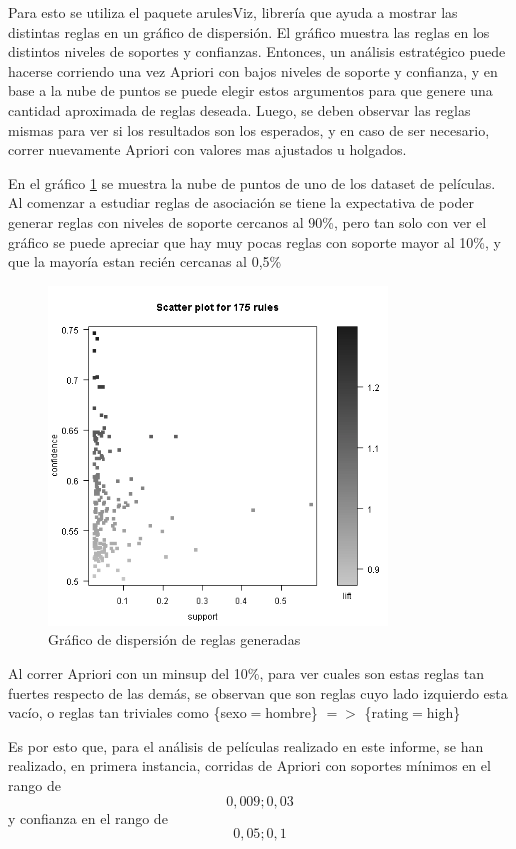 \documentclass[journal]{IEEEtran}
\begin{document}
Para esto se utiliza el paquete arulesViz, librería que ayuda a mostrar las 
distintas reglas en un gráfico de dispersión. El gráfico muestra las reglas
en los distintos niveles de soportes y confianzas. Entonces, un análisis estratégico
puede hacerse corriendo una vez Apriori con bajos niveles de soporte y confianza, y 
en base a la nube de puntos se puede elegir estos argumentos para que genere 
una  cantidad aproximada de reglas deseada. Luego, se deben observar las reglas mismas para ver
si los resultados son los esperados, y en caso de ser necesario, correr nuevamente
Apriori con valores mas ajustados u holgados.

En el gráfico \ref{arulesviz} se muestra la nube de puntos de uno de los dataset de películas.
Al comenzar a estudiar reglas de asociación se tiene la expectativa de poder generar
reglas con niveles de soporte cercanos al 90\%, pero tan solo con ver el gráfico
se puede apreciar que hay muy pocas reglas con soporte mayor al 10\%, y que la mayoría
estan recién cercanas al 0,5\%

\begin{figure}[ht!]
\centering
\includegraphics[width=90mm]{arulesviz.png}
\caption{Gráfico de dispersión de reglas generadas}
\label{arulesviz}
\end{figure}

Al correr Apriori con un minsup del 10\%, para ver cuales son estas reglas tan
fuertes respecto de las demás, se observan que son reglas cuyo lado izquierdo
esta vacío, o reglas tan triviales como \{sexo$=$hombre\} $=$$>$ \{rating$=$high\}

Es por esto que, para el análisis de películas realizado en este informe, se han
realizado, en primera instancia, 
 corridas de Apriori con soportes mínimos en el rango de \[0,009 ; 0,03\]
y confianza en el rango de \[0,05 ; 0,1\]
\end{document}
